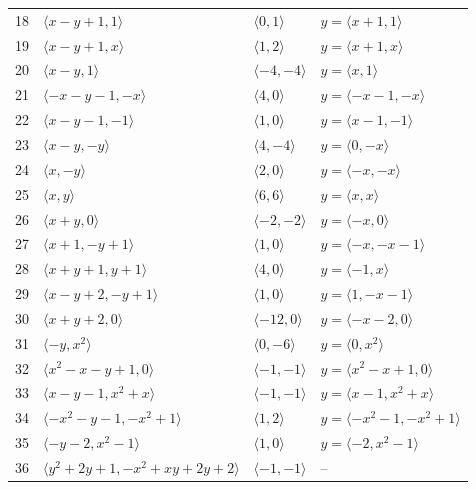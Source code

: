 \documentclass[11pt]{article}
\begin{document}
\begin{longtable}{@{}rlll@{}}
18 & $\langle x-y+1,1\rangle$ & $\langle 0,1\rangle$ & $y=\langle x+1,1\rangle$\\
19 & $\langle x-y+1,x\rangle$ & $\langle 1,2\rangle$ & $y=\langle x+1,x\rangle$\\
20 & $\langle x-y,1\rangle$ & $\langle -4,-4\rangle$ & $y=\langle x,1\rangle$\\
21 & $\langle -x-y-1,-x\rangle$ & $\langle 4,0\rangle$ & $y=\langle -x-1,-x\rangle$\\
22 & $\langle x-y-1,-1\rangle$ & $\langle 1,0\rangle$ & $y=\langle x-1,-1\rangle$\\
23 & $\langle x-y,-y\rangle$ & $\langle 4,-4\rangle$ & $y=\langle 0,-x\rangle$\\
24 & $\langle x,-y\rangle$ & $\langle 2,0\rangle$ & $y=\langle -x,-x\rangle$\\
25 & $\langle x,y\rangle$ & $\langle 6,6\rangle$ & $y=\langle x,x\rangle$\\
26 & $\langle x+y,0\rangle$ & $\langle -2,-2\rangle$ & $y=\langle -x,0\rangle$\\
27 & $\langle x+1,-y+1\rangle$ & $\langle 1,0\rangle$ & $y=\langle -x,-x-1\rangle$\\
28 & $\langle x+y+1,y+1\rangle$ & $\langle 4,0\rangle$ & $y=\langle -1,x\rangle$\\
29 & $\langle x-y+2,-y+1\rangle$ & $\langle 1,0\rangle$ & $y=\langle 1,-x-1\rangle$\\
30 & $\langle x+y+2,0\rangle$ & $\langle -12,0\rangle$ & $y=\langle -x-2,0\rangle$\\
31 & $\langle -y,x^{2}\rangle$ & $\langle 0,-6\rangle$ & $y=\langle 0,x^{2}\rangle$\\
32 & $\langle x^{2}-x-y+1,0\rangle$ & $\langle -1,-1\rangle$ & $y=\langle x^{2}-x+1,0\rangle$\\
33 & $\langle x-y-1,x^{2}+x\rangle$ & $\langle -1,-1\rangle$ & $y=\langle x-1,x^{2}+x\rangle$\\
34 & $\langle -x^{2}-y-1,-x^{2}+1\rangle$ & $\langle 1,2\rangle$ & $y=\langle -x^{2}-1,-x^{2}+1\rangle$\\
35 & $\langle -y-2,x^{2}-1\rangle$ & $\langle 1,0\rangle$ & $y=\langle -2,x^{2}-1\rangle$\\
36 & $\langle y^{2}+2y+1,-x^{2}+xy+2y+2\rangle$ & $\langle -1,-1\rangle$ & --\\
\end{longtable}
\endgroup
\end{document}
